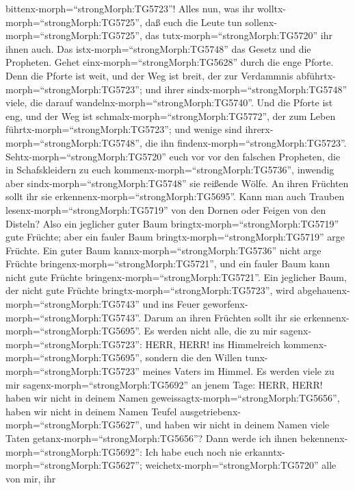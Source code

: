 bittenx-morph=``strongMorph:TG5723''!  Alles nun, was ihr
wolltx-morph=``strongMorph:TG5725'', daß euch die Leute tun
sollenx-morph=``strongMorph:TG5725'', das
tutx-morph=``strongMorph:TG5720'' ihr ihnen auch. Das
istx-morph=``strongMorph:TG5748'' das Gesetz und die Propheten.
 Gehet einx-morph=``strongMorph:TG5628'' durch die enge
Pforte. Denn die Pforte ist weit, und der Weg ist breit, der zur
Verdammnis abführtx-morph=``strongMorph:TG5723''; und ihrer
sindx-morph=``strongMorph:TG5748'' viele, die darauf
wandelnx-morph=``strongMorph:TG5740''.  Und die Pforte ist
eng, und der Weg ist schmalx-morph=``strongMorph:TG5772'', der zum Leben
führtx-morph=``strongMorph:TG5723''; und wenige sind
ihrerx-morph=``strongMorph:TG5748'', die ihn
findenx-morph=``strongMorph:TG5723''. 
Sehtx-morph=``strongMorph:TG5720'' euch vor vor den falschen Propheten,
die in Schafskleidern zu euch kommenx-morph=``strongMorph:TG5736'',
inwendig aber sindx-morph=``strongMorph:TG5748'' sie reißende Wölfe.
 An ihren Früchten sollt ihr sie
erkennenx-morph=``strongMorph:TG5695''. Kann man auch Trauben
lesenx-morph=``strongMorph:TG5719'' von den Dornen oder Feigen von den
Disteln?  Also ein jeglicher guter Baum
bringtx-morph=``strongMorph:TG5719'' gute Früchte; aber ein fauler Baum
bringtx-morph=``strongMorph:TG5719'' arge Früchte.  Ein
guter Baum kannx-morph=``strongMorph:TG5736'' nicht arge Früchte
bringenx-morph=``strongMorph:TG5721'', und ein fauler Baum kann nicht
gute Früchte bringenx-morph=``strongMorph:TG5721''.  Ein
jeglicher Baum, der nicht gute Früchte
bringtx-morph=``strongMorph:TG5723'', wird
abgehauenx-morph=``strongMorph:TG5743'' und ins Feuer
geworfenx-morph=``strongMorph:TG5743''.  Darum an ihren
Früchten sollt ihr sie erkennenx-morph=``strongMorph:TG5695''.
 Es werden nicht alle, die zu mir
sagenx-morph=``strongMorph:TG5723'': HERR, HERR! ins Himmelreich
kommenx-morph=``strongMorph:TG5695'', sondern die den Willen
tunx-morph=``strongMorph:TG5723'' meines Vaters im Himmel. 
Es werden viele zu mir sagenx-morph=``strongMorph:TG5692'' an jenem
Tage: HERR, HERR! haben wir nicht in deinem Namen
geweissagtx-morph=``strongMorph:TG5656'', haben wir nicht in deinem
Namen Teufel ausgetriebenx-morph=``strongMorph:TG5627'', und haben wir
nicht in deinem Namen viele Taten getanx-morph=``strongMorph:TG5656''?
 Dann werde ich ihnen
bekennenx-morph=``strongMorph:TG5692'': Ich habe euch noch nie
erkanntx-morph=``strongMorph:TG5627'';
weichetx-morph=``strongMorph:TG5720'' alle von mir, ihr
